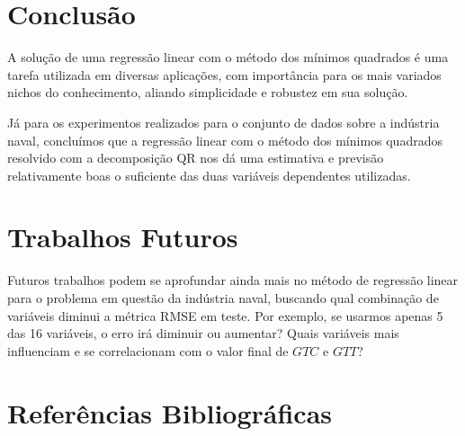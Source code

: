 \documentclass[a4paper, 12pt]{article}
\theoremstyle{definition}
\theoremstyle{remark}
\begin{document}
\newpage
\section{Conclusão}

A solução de uma regressão linear com o método dos mínimos quadrados é uma tarefa utilizada em diversas aplicações, com importância para os mais variados nichos do conhecimento, aliando simplicidade e robustez em sua solução.

Já para os experimentos realizados para o conjunto de dados sobre a indústria naval, concluímos que a regressão linear com o método dos mínimos quadrados resolvido com a decomposição QR nos dá uma estimativa e previsão relativamente boas o suficiente das duas variáveis dependentes utilizadas.

\newpage
\section{Trabalhos Futuros}

Futuros trabalhos podem se aprofundar ainda mais no método de regressão linear para o problema em questão da indústria naval, buscando qual combinação de variáveis diminui a métrica RMSE em teste. Por exemplo, se usarmos apenas 5 das 16 variáveis, o erro irá diminuir ou aumentar? Quais variáveis mais influenciam e se correlacionam com o valor final de $GTC$ e $GTT$?

\newpage
\section{Referências Bibliográficas}

\nocite{reamat}
\nocite{Coraddu2013Machine}
\nocite{gram-notes}

\printbibliography[heading=none]
\end{document}
